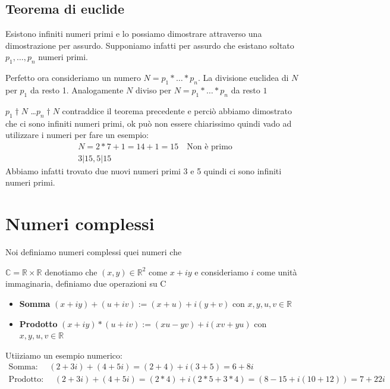 \documentclass{article}
\begin{document}
\subsection{Teorema di euclide}
Esistono infiniti numeri primi e lo possiamo dimostrare attraverso una dimostrazione per assurdo.
Supponiamo infatti per assurdo che esistano soltato $p_1,\ldots,p_n$ numeri primi. \par
Perfetto ora consideriamo un numero $N = p_1* \ldots * p_n$.
La divisione euclidea di $N$ per $p_1$ da resto 1.
Analogamente $N$ diviso per $N = p_1* \ldots * p_n$ da resto $1$ \par

$p_1 \dag N$ \ldots  $p_n \dag N$ contraddice il teorema precedente e perciò abbiamo dimostrato che ci sono infiniti numeri primi, ok può non essere chiarissimo quindi vado ad utilizzare i numeri per fare un esempio:
\begin{align*}
        N = 2 * 7 + 1 = 14 + 1 = 15 \quad \textrm{Non è primo} \\
        3 | 15, 5 | 15
\end{align*}
Abbiamo infatti trovato due nuovi numeri primi 3 e 5 quindi ci sono infiniti numeri primi.





\newpage
\section{Numeri complessi}\label{sec:numeri_complessi}
Noi definiamo numeri complessi quei numeri che


$\mathbb{C} = \mathbb{R} \times \mathbb{R}$ denotiamo che $(x,y) \in \mathbb{R}^2$ come $x + iy$ e consideriamo $i$ come unità immaginaria, definiamo due operazioni su C
\begin{itemize}
        \item \textbf{Somma} $(x + iy) + (u + iv) := (x+u) + i(y+v)$ con $x,y,u,v \in \mathbb{R}$
        \item \textbf{Prodotto} $(x + iy) * (u + iv) := (xu - yv) + i(xv+yu)$ con $x,y,u,v \in \mathbb{R}$
\end{itemize}

Utiiziamo un esempio numerico:
\begin{align}
        \textrm{Somma: } \quad (2 + 3i) + (4 + 5i) = (2 + 4) + i(3 + 5) = 6 + 8i \\
        \textrm{Prodotto: } \quad (2 + 3i) + (4 + 5i) = (2 * 4) + i(2*5 + 3*4) = (8-15 + i(10+12)) = 7 + 22i
\end{align}
\end{document}
